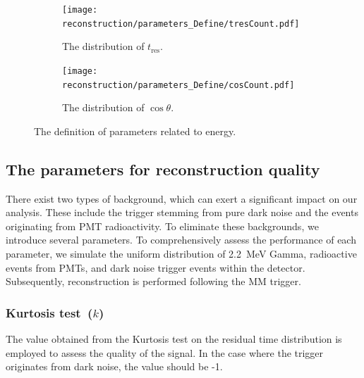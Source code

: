 \begin{figure}[h]
	\centering
	\begin{subfigure}{0.5\textwidth}
		\centering
		\texttt{[image: reconstruction/parameters\_Define/tresCount.pdf]}
		\caption{The distribution of $t_{\mathrm{res}}$.}
		\label{fig:n20def}
	\end{subfigure}%
	\begin{subfigure}{0.5\textwidth}
		\centering
		\texttt{[image: reconstruction/parameters\_Define/cosCount.pdf]}
		\caption{The distribution of $\cos\theta$.}
		\label{fig:nc}
	\end{subfigure}
	\caption{The definition of parameters related to energy.}
	\label{fig:dual}
\end{figure}

\subsection{The parameters for reconstruction quality}
There exist two types of background, which can exert a significant impact on our analysis. These include the trigger stemming from pure dark noise and the events originating from PMT radioactivity. To eliminate these backgrounds, we introduce several parameters. To comprehensively assess the performance of each parameter, we simulate the uniform distribution of \SI{2.2}{MeV} Gamma, radioactive events from PMTs, and dark noise trigger events within the detector. Subsequently, reconstruction is performed following the MM trigger.

\subsubsection{Kurtosis test~($k$)}
The value obtained from the Kurtosis test on the residual time distribution is employed to assess the quality of the signal. In the case where the trigger originates from dark noise, the value should be -1.

